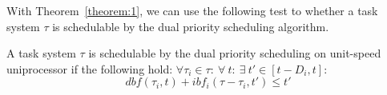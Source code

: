 With Theorem~\ref{theorem:1}, we can use the following test to whether a task system $\tau$ is schedulable by the dual priority scheduling algorithm.
\begin{theorem}
A task system $\tau$ is schedulable by the dual priority scheduling on unit-speed uniprocessor if the following hold: $\forall \tau_i\in \tau:~\forall~t:~\exists~t'\in[t-D_i, t]:~$
\begin{equation}
dbf(\tau_i,t)+ibf_i(\tau-\tau_i,t')\leq t'
\end{equation}
\end{theorem}
